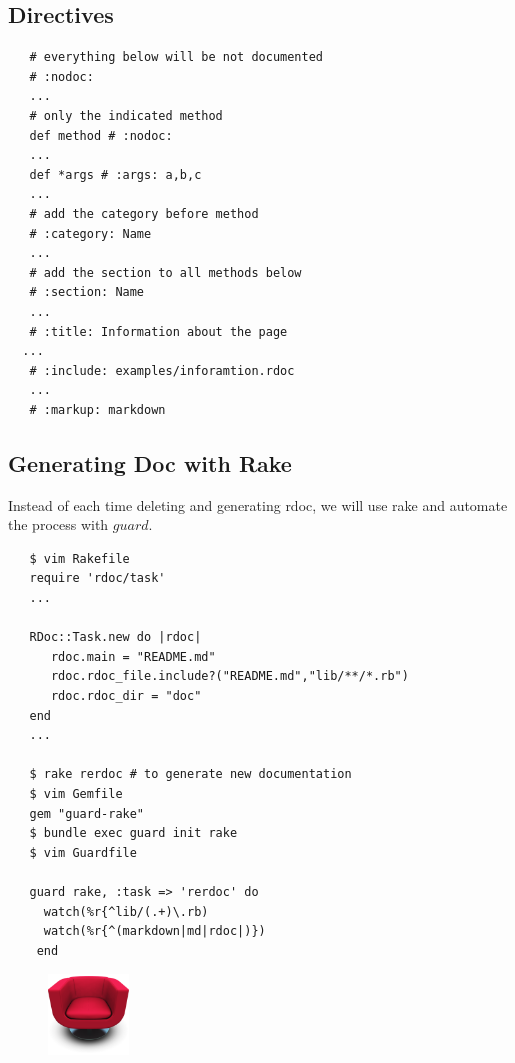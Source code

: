 \documentclass{article}
\begin{document}
  \newpage

  \subsection{Directives}

   \begin{lstlisting}
   # everything below will be not documented 
   # :nodoc:
   ...
   # only the indicated method
   def method # :nodoc:
   ... 
   def *args # :args: a,b,c
   ...
   # add the category before method
   # :category: Name
   ...
   # add the section to all methods below
   # :section: Name
   ...
   # :title: Information about the page
  ...
   # :include: examples/inforamtion.rdoc
   ...
   # :markup: markdown
   \end{lstlisting}

  \subsection{Generating Doc with Rake}

  Instead of each time deleting and generating rdoc, we will use rake
  and automate the process with $guard$.

   \begin{lstlisting}
   $ vim Rakefile
   require 'rdoc/task'
   ...

   RDoc::Task.new do |rdoc|
      rdoc.main = "README.md"
      rdoc.rdoc_file.include?("README.md","lib/**/*.rb")
      rdoc.rdoc_dir = "doc"
   end
   ...

   $ rake rerdoc # to generate new documentation
   $ vim Gemfile
   gem "guard-rake"
   $ bundle exec guard init rake
   $ vim Guardfile

   guard rake, :task => 'rerdoc' do                                                
     watch(%r{^lib/(.+)\.rb)                                                       
     watch(%r{^(markdown|md|rdoc|)})                                               
    end                                                                             
   \end{lstlisting}

  \begin{figure}
    \vspace{-55pt}
    \begin{center}
      \includegraphics[width=0.19\textwidth]{magenta}
    \end{center}
    \vspace{-40pt}
  \end{figure}
\end{document}
